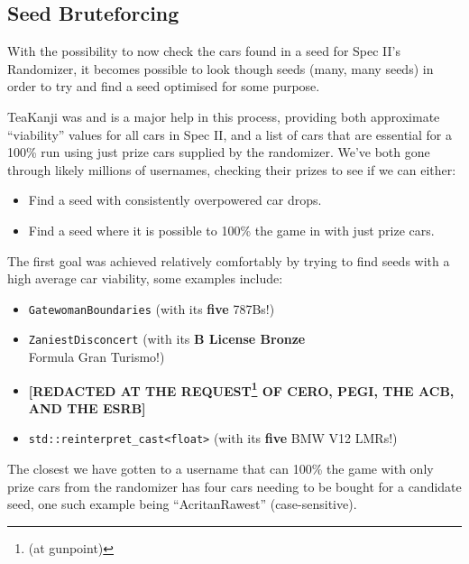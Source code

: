 \documentclass[14pt,a4paper,notitlepage]{extarticle}
\begin{document}
        \subsection*{Seed Bruteforcing}
            With the possibility to now check the cars found in a seed for Spec II's
            Randomizer, it becomes possible to look though seeds (many, many seeds) in order
            to try and find a seed optimised for some purpose.

            TeaKanji was and is a major help in this process, providing both approximate
            ``viability'' values for all cars in Spec II, and a list of cars that are essential
            for a 100\% run using just prize cars supplied by the randomizer. We've both gone
            through likely millions of usernames, checking their prizes to see if we can either:

            \begin{itemize}
                \item Find a seed with consistently overpowered car drops.
                \item Find a seed where it is possible to 100\% the game in with just prize cars.
            \end{itemize}

            The first goal was achieved relatively comfortably by trying to find seeds with
            a high average car viability, some examples include:

            \begin{itemize}
                \item \texttt{GatewomanBoundaries} (with its \textbf{five} 787Bs!)
                \item \texttt{ZaniestDisconcert} (with its \textbf{B License Bronze}\\Formula
                Gran Turismo!)
                \item \textbf{[REDACTED AT THE REQUEST\footnote{(at gunpoint)} OF CERO, PEGI,
                THE ACB, AND THE ESRB]}
                \item \texttt{std::reinterpret\_cast<float>} (with its \textbf{five} BMW V12
                LMRs!)
            \end{itemize}

            The closest we have gotten to a username that can 100\% the game with only prize cars
            from the randomizer has four cars needing to be bought for a candidate seed, one such
            example being ``AcritanRawest'' (case-sensitive).
\end{document}
